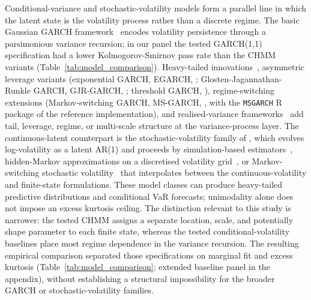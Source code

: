 Conditional-variance and stochastic-volatility models form a parallel line in which the latent state is the volatility process rather than a discrete regime. The basic Gaussian GARCH framework~\cite{engle1982autoregressive, bollerslev1986generalized} encodes volatility persistence through a parsimonious variance recursion; in our panel the tested GARCH(1,1) specification had a lower Kolmogorov-Smirnov pass rate than the CHMM variants (Table~\ref{tab:model_comparison}). Heavy-tailed innovations~\cite{bollerslev1987conditionally}, asymmetric leverage variants (exponential GARCH, EGARCH, \citealp{nelson1991conditional}; Glosten-Jagannathan-Runkle GARCH, GJR-GARCH, \citealp{glosten1993relation}; threshold GARCH, \citealp{zakoian1994threshold}), regime-switching extensions (Markov-switching GARCH, MS-GARCH, \citealp{haas2004new}, with the \texttt{MSGARCH} R package of \citealp{ardia2019msgarch} the reference implementation), and realised-variance frameworks~\cite{andersen1997heterogeneous, corsi2009simple} add tail, leverage, regime, or multi-scale structure at the variance-process layer. The continuous-latent counterpart is the stochastic-volatility family of \citet{taylor1982financial}, which evolves log-volatility as a latent AR(1) and proceeds by simulation-based estimators~\cite{jacquier1994bayesian, kim1998stochastic}, hidden-Markov approximations on a discretised volatility grid~\cite{rossi2006volatility, abantovalle2017svm}, or Markov-switching stochastic volatility~\cite{so1998stochastic} that interpolates between the continuous-volatility and finite-state formulations. These model classes can produce heavy-tailed predictive distributions and conditional VaR forecasts; unimodality alone does not impose an excess kurtosis ceiling. The distinction relevant to this study is narrower: the tested CHMM assigns a separate location, scale, and potentially shape parameter to each finite state, whereas the tested conditional-volatility baselines place most regime dependence in the variance recursion. The resulting empirical comparison separated those specifications on marginal fit and excess kurtosis (Table~\ref{tab:model_comparison}; extended baseline panel in the appendix), without establishing a structural impossibility for the broader GARCH or stochastic-volatility families.


